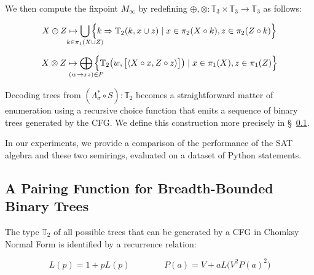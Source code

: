 \documentclass[sigplan,review,anonymous,acmsmall]{acmart}\settopmatter{printfolios=false,printccs=false,printacmref=false}
\begin{document}
  \noindent We then compute the fixpoint $M_\infty$ by redefining $\oplus, \otimes: \mathbb{T}_3 \times \mathbb{T}_3 \rightarrow \mathbb{T}_3$ as follows:

  \begin{equation}
    X \oplus Z \mapsto \bigcup_{\mathclap{k\in \pi_1(X \cup Z)}}\Big\{k \Rightarrow \mathbb{T}_2(k, x \cup z) \mid x \in \pi_2(X\circ k), z \in \pi_2(Z\circ k)\Big\}
  \end{equation}

  \begin{equation}
    X \otimes Z \mapsto \bigoplus_{\mathclap{(w\rightarrow xz) \in P}}\Big\{\mathbb{T}_2\big(w, \big[\langle X\circ x, Z\circ z\rangle\big]\big) \mid x \in \pi_1(X), z \in \pi_1(Z)\Big\}
  \end{equation}

  Decoding trees from $(\Lambda_\sigma^* \circ S): \mathbb{T}_2$ becomes a straightforward matter of enumeration using a recursive choice function that emits a sequence of binary trees generated by the CFG. We define this construction more precisely in \S~\ref{sec:pairing}.


  In our experiments, we provide a comparison of the performance of the SAT algebra and these two semirings, evaluated on a dataset of Python statements.

  \pagebreak\subsection{A Pairing Function for Breadth-Bounded Binary Trees}\label{sec:pairing}

  The type $\mathbb{T}_2$ of all possible trees that can be generated by a CFG in Chomksy Normal Form is identified by a recurrence relation:

  \begin{equation}
    L(p) = 1 + p L(p) \phantom{addspace} P(a) = V + a L\big(V^2P(a)^2\big)
  \end{equation}
\end{document}
